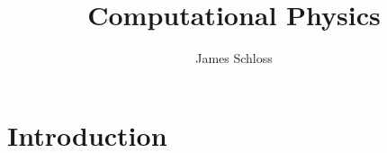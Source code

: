 \documentclass[11pt]{book}
\title{\textbf{Computational Physics}}
\author{James Schloss}
\date{}
\begin{document}
\maketitle

\section*{Introduction}

\end{document}
